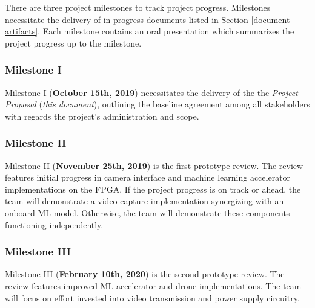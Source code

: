 There are three project milestones to track project progress.
Milestones necessitate the delivery of in-progress documents listed
in Section \ref{document-artifacts}. Each milestone contains an oral
presentation which summarizes the project progress up to the milestone.

\subsubsection{Milestone I}
Milestone I (\textbf{October 15th, 2019}) necessitates the delivery of the
the \textit{Project Proposal} (\textit{this document}), outlining
the baseline agreement among all stakeholders with 
regards the project's administration and scope.

\subsubsection{Milestone II}
Milestone II (\textbf{November 25th, 2019}) is the first prototype review. 
The review features initial progress in camera interface
and machine learning accelerator implementations on the FPGA.
If the project progress is on track or ahead, the team will demonstrate a video-capture implementation synergizing with an onboard ML model. Otherwise, the team will
demonstrate these components functioning independently.

\subsubsection{Milestone III}
Milestone III (\textbf{February 10th, 2020}) is the second prototype review.
The review features improved ML accelerator and drone implementations. The team will
focus on effort invested into video transmission and power supply circuitry.
